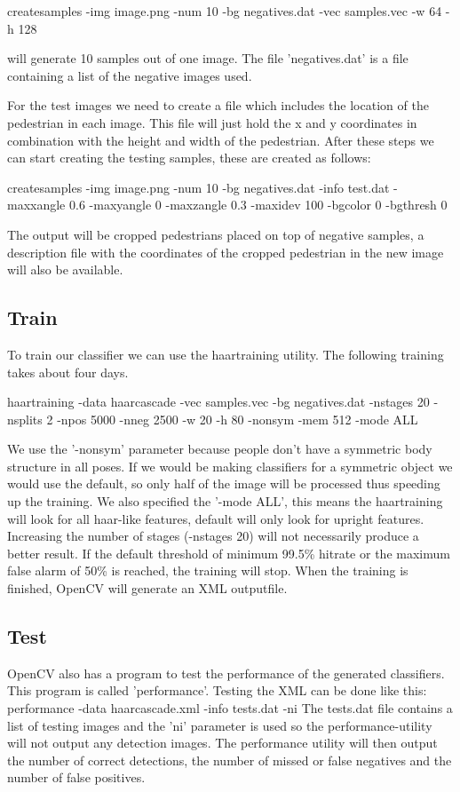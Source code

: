\documentclass{article}
\begin{document}
createsamples -img image.png -num 10 -bg negatives.dat -vec samples.vec -w 64 -h 128

will generate 10 samples out of one image.
The file 'negatives.dat' is a file containing a list of the negative images used.

For the test images we need to create a file which includes the location of the pedestrian in each image. This file will just hold the x and y coordinates in combination with the height and width of the pedestrian.
After these steps we can start creating the testing samples, these are created as follows:

createsamples -img image.png -num 10 -bg negatives.dat -info test.dat -maxxangle 0.6 -maxyangle 0 -maxzangle 0.3 -maxidev 100 -bgcolor 0 -bgthresh 0

The output will be cropped pedestrians placed on top of negative samples, a description file with the coordinates of the cropped pedestrian in the new image will also be available.




\subsection{Train}
To train our classifier we can use the haartraining utility. The following training takes about four days.

haartraining -data haarcascade -vec samples.vec -bg negatives.dat -nstages 20 -nsplits 2 -npos 5000 -nneg 2500 -w 20 -h 80 -nonsym -mem 512 -mode ALL

We use the '-nonsym' parameter because people don't have a symmetric body structure in all poses. If we would be making classifiers for a symmetric object we would use the default, so only half of the image will be processed  thus speeding up the training. We also specified the '-mode ALL', this means the haartraining will look for all haar-like features, default will only look for upright features.
Increasing the number of stages (-nstages 20) will not necessarily produce a better result. If the default threshold of minimum 99.5\% hitrate or the maximum false alarm of 50\% is reached, the training will stop.
When the training is finished, OpenCV will generate an XML outputfile.
\subsection{Test}
OpenCV also has a program to test the performance of the generated classifiers. This program is called 'performance'. Testing the XML can be done like this:
performance -data haarcascade.xml -info tests.dat -ni
The tests.dat file contains a list of testing images and the 'ni' parameter is used so the performance-utility will not output any detection images.
The performance utility will then output the number of correct detections, the number of missed or false negatives and the number of false positives.
\end{document}
